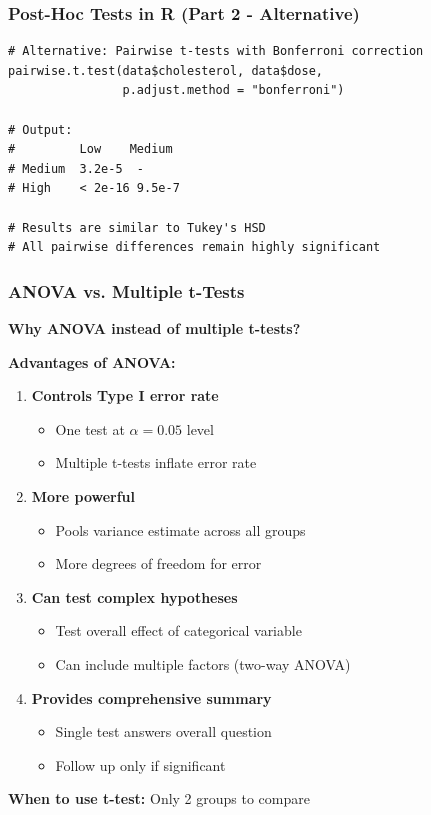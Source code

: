 \documentclass{beamer}
\begin{document}
\begin{frame}[fragile]
\frametitle{Post-Hoc Tests in R (Part 2 - Alternative)}
\small
\begin{verbatim}
# Alternative: Pairwise t-tests with Bonferroni correction
pairwise.t.test(data$cholesterol, data$dose,
                p.adjust.method = "bonferroni")

# Output:
#         Low    Medium
# Medium  3.2e-5  -
# High    < 2e-16 9.5e-7

# Results are similar to Tukey's HSD
# All pairwise differences remain highly significant
\end{verbatim}
\end{frame}

\begin{frame}
\frametitle{ANOVA vs. Multiple t-Tests}
\textbf{Why ANOVA instead of multiple t-tests?}

\vspace{0.5cm}
\textbf{Advantages of ANOVA:}
\begin{enumerate}
\item \textbf{Controls Type I error rate}
\begin{itemize}
\item One test at $\alpha = 0.05$ level
\item Multiple t-tests inflate error rate
\end{itemize}

\item \textbf{More powerful}
\begin{itemize}
\item Pools variance estimate across all groups
\item More degrees of freedom for error
\end{itemize}

\item \textbf{Can test complex hypotheses}
\begin{itemize}
\item Test overall effect of categorical variable
\item Can include multiple factors (two-way ANOVA)
\end{itemize}

\item \textbf{Provides comprehensive summary}
\begin{itemize}
\item Single test answers overall question
\item Follow up only if significant
\end{itemize}
\end{enumerate}

\vspace{0.3cm}
\textbf{When to use t-test:} Only 2 groups to compare
\end{frame}
\end{document}
